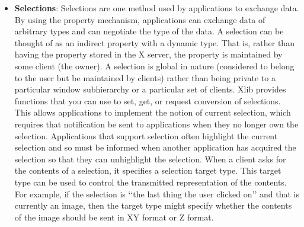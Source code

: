 \documentclass{report}
\begin{document}
\begin{itemize}
        \bigbreak \noindent 
        To delete a property on a given window, use \textbf{XDeleteProperty.}
        \bigbreak \noindent 
        \begin{cppcode}
            XDeleteProperty (display, w, property)
        \end{cppcode}
        \begin{itemize}
            \item display Specifies the connection to the X server.
            \item $w$ Specifies the window whose property you want to delete.
            \item property Specifies the property name.
        \end{itemize}
        The \textbf{XDeleteProperty} function deletes the specified property only if the property was defined on the specified window and causes the X server to generate a \textbf{PropertyNotify} event on the window unless the property does not exist.
        \bigbreak \noindent 
        \textbf{XDeleteProperty} can generate \textbf{BadAtom} and \textbf{BadWindow} errors.
    \item \textbf{Selections}: Selections are one method used by applications to exchange data. By using the property mechanism, applications can exchange data of arbitrary types and can negotiate the type of the data. A selection can be thought of as an indirect property with a dynamic type. That is, rather than having the property stored in the X server, the property is maintained by some client (the owner). A selection is global in nature (considered to belong to the user but be maintained by clients) rather than being private to a particular window subhierarchy or a particular set of clients. Xlib provides functions that you can use to set, get, or request conversion of selections. This allows applications to implement the notion of current selection, which requires that notification
        be sent to applications when they no longer own the selection. Applications that support selection often highlight the current selection and so must be informed when another application has acquired the selection so that they can unhighlight the selection.
        \bigbreak \noindent 
        When a client asks for the contents of a selection, it specifies a selection target type. This target type can be used to control the transmitted representation of the contents. For example, if the selection is ‘‘the last thing the user clicked on’’ and that is currently an image, then the target type might specify whether the contents of the image should be sent in XY format or Z format.

\end{itemize}
\end{document}
